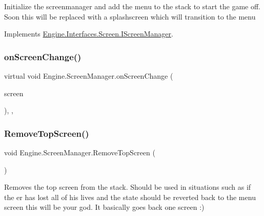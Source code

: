 Initialize the screenmanager and add the menu to the stack to start the game off. Soon this will be replaced with a splashscreen which will transition to the menu 



Implements \hyperlink{a00470_ae37c13c038cdb202262013731985eb10}{Engine.\+Interfaces.\+Screen.\+I\+Screen\+Manager}.

\mbox{\label{a00538_a973c15b5fff9fb873ed988ea69ccbfd1}} 
\subsubsection{\texorpdfstring{on\+Screen\+Change()}{onScreenChange()}}
{\footnotesize\ttfamily virtual void Engine.\+Screen\+Manager.\+on\+Screen\+Change (\begin{DoxyParamCaption}\item[{\hyperlink{a00550}{Base\+Screen}}]{screen }\end{DoxyParamCaption})\hspace{0.3cm}{\ttfamily [inline]}, {\ttfamily [protected]}, {\ttfamily [virtual]}}

\mbox{\label{a00538_ab553bead481adc65547a323af9dab2d5}} 
\subsubsection{\texorpdfstring{Remove\+Top\+Screen()}{RemoveTopScreen()}}
{\footnotesize\ttfamily void Engine.\+Screen\+Manager.\+Remove\+Top\+Screen (\begin{DoxyParamCaption}{ }\end{DoxyParamCaption})\hspace{0.3cm}{\ttfamily [inline]}}



Removes the top screen from the stack. Should be used in situations such as if the er has lost all of his lives and the state should be reverted back to the menu screen this will be your god. It basically goes back one screen \+:) 



